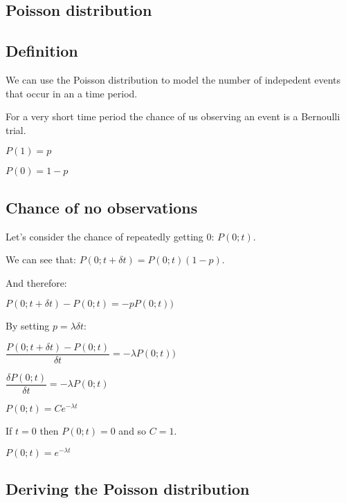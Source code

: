 
\subsection{Poisson distribution}

\subsection{Definition}

We can use the Poisson distribution to model the number of indepedent events that occur in an a time period.

For a very short time period the chance of us observing an event is a Bernoulli trial.

\(P(1)=p\)

\(P(0)=1-p\)

\subsection{Chance of no observations}

Let's consider the chance of repeatedly getting \(0\): \(P(0;t)\).

We can see that: \(P(0;t+\delta t)=P(0;t)(1-p)\).

And therefore:

\(P(0;t+\delta t)-P(0;t)=-pP(0;t))\)

By setting \(p=\lambda \delta t\):

\(\dfrac{P(0;t+\delta t)-P(0;t)}{\delta t}=-\lambda P(0;t))\)

\(\dfrac{\delta P(0;t)}{\delta t}=-\lambda P(0;t)\)

\(P(0;t)=Ce^{-\lambda t}\)

If \(t=0\) then \(P(0;t)=0\) and so \(C=1\).

\(P(0;t)=e^{-\lambda t}\)

\subsection{Deriving the Poisson distribution}


